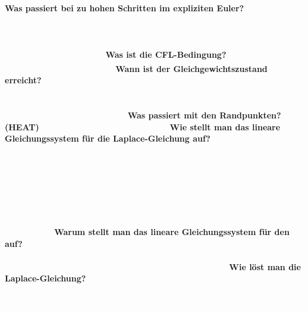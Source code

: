 \documentclass{beamer}
\newcommand{\chf}{Cholesky-Faktorisierung\xspace}
\begin{document}
{{{} }
{\textbf{Was passiert bei zu hohen Schritten im expliziten Euler?\newline} \textcolor<1>{white}{
		Er konvergiert nicht mehr, da die Nachbarn einen zu hohen Einfluss auf die Lösung haben. Um ihn trotzdem zu berechnen, müsste man mehr Nachbarn in Betracht ziehen, da bei zu hohen Zeitschritten auch weit entfernte Nachbarn einen Einfluss auf den betrachteten Punkt haben.
} }
{\textbf{Was ist die CFL-Bedingung?\newline} \textcolor<1>{white}{
		$\delta t\leq\frac{h}{\|v\|}$, mit Informationskonstante $\|v\|$.
} }
{\textbf{Wann ist der Gleichgewichtszustand erreicht?\newline} \textcolor<1>{white}{
		Der implizite Euler konvergiert immer gegen den statischen Gleichgewichtszustand der Heat-Equation, der durch die Laplace-Equation $\mathop{\!\mathbin\bigtriangleup}u=0$ beschrieben wird. Während der explizite Euler nur bei ausreichend kleinen Zeitschritten konvergiert.
} }
{\textbf{Was passiert mit den Randpunkten? (HEAT)\newline} \textcolor<1>{white}{
		Die Randpunkte bleiben konstant.
} }
{\textbf{Wie stellt man das lineare Gleichungssystem für die Laplace-Gleichung auf?\newline} \textcolor<1>{white}{
	Jeder Punkt im Gitter ist eine Unbekannte, die berechnet werden muss. Wir haben also bei einem $(N$ x $N)$ Gitter $(N-2)$x$(N-2)$ Unbekannte (Randpunkte verändern sich nicht). Dies führt zu einem $(N-2)^2$ x $(N-2)^2$ Gleichungssystem $-Lu=b$.
	$u$ ist ein Spaltenvektor in dem die neuen Werte $u$ für das Gitter stehen. Die Reihenfolge, in der die Gitterpunkte in $u$ stehen, führt zu einer Index Abbildung: $u_k=u(i,j)$ mit $k=idx(i,j)=(i-1)+(j-2)\cdot(N-2)$.
	Für die Matrix L gilt: $l_{kk}=4, l_{kl}=-1/h^2$, wenn (\={i}, \={j}) Nachbarn von i, j und $l$=idx(\={i},\={j}) sonst $l_{kl}=0$.
} }
{\textbf{Warum stellt man das lineare Gleichungssystem für den auf?\newline} \textcolor<1>{white}{
 Wir wollen nur das Gleichgewicht $\mathop{\!\mathbin\bigtriangleup}u=0$ betrachten, welches nicht mit expliziter Integration lösbar ist. Der Grund ist, dass es sich dabei um eine statische PDE handelt, die nicht mehr von der Zeit abhängt.
} }
{\textbf{Wie löst man die Laplace-Gleichung?\newline} \textcolor<1>{white}{
		Die Laplace-Gleichung ist mittels \chf lösbar. Die Zeitkomplexität ist allerdings mit $\mathcal{O(n^3)}$ recht hoch, sodass unter anderem konjugierte Gradienten verwendet werden können. 
}}}
\end{document}
